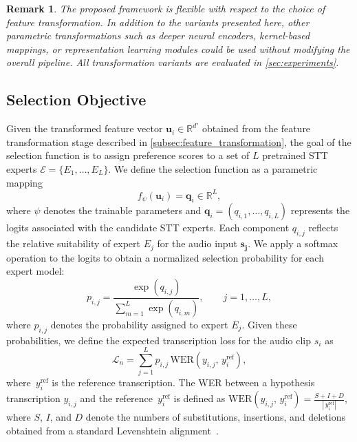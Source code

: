 \documentclass[journal]{IEEEtran}
\newtheorem{remark}{Remark}
\begin{document}
    \begin{remark}
        The proposed framework is flexible with respect to the choice of feature
        transformation. In addition to the variants presented here, other parametric
        transformations such as deeper neural encoders, kernel-based mappings, or
        representation learning modules could be used without modifying the overall
        pipeline. All transformation variants are evaluated in
        \cref{sec:experiments}.
    \end{remark}

    \subsection{Selection Objective}
    \label{subsec:selection_objective}

    Given the transformed feature vector $\mathbf{u}_{i}\in \mathbb{R}^{d'}$
    obtained from the feature transformation stage described in
    \cref{subsec:feature_transformation}, the goal of the selection function is to
    assign preference scores to a set of $L$ pretrained STT experts $\mathcal{E}=
    \{E_{1},\dots,E_{L}\}$. We define the selection function as a parametric
    mapping
    \[
        f_{\psi}(\mathbf{u}_{i}) = \mathbf{q}_{i}\in \mathbb{R}^{L},
    \]
    where $\psi$ denotes the trainable parameters and
    $\mathbf{q}_{i}= (q_{i,1}, \dots,q_{i,L})$ represents the logits associated
    with the candidate STT experts. Each component $q_{i,j}$ reflects the relative
    suitability of expert $E_{j}$ for the audio input $\mathbf{s_{j}}$. We apply a 
    softmax operation to the logits to obtain a normalized selection probability
    for each expert model:
    \begin{equation}
        p_{i,j}= \frac{\exp(q_{i,j})}{\sum_{m=1}^{L}\exp(q_{i,m})}, \qquad j=1,\dots
        ,L, \label{eq:softmax_router}
    \end{equation}
    where $p_{i,j}$ denotes the probability assigned to expert $E_{j}$. Given
    these probabilities, we define the expected transcription loss for the audio
    clip $s_{i}$ as
    \begin{equation}
        \mathcal{L}_{n}= \sum_{j=1}^{L}p_{i,j}\,\mathrm{WER}(y_{i,j},\,y_i^{\mathrm{ref}}), \label{eq:expected_loss}
    \end{equation}
    where $\,y_i^{\mathrm{ref}}$ is the reference transcription. The WER between a hypothesis
    transcription $y_{i,j}$ and the reference $\,y_i^{\mathrm{ref}}$ is defined as
    $\mathrm{WER}(y_{i,j}, \,y_i^{\mathrm{ref}}) = \frac{S + I + D}{|\,y_i^{\mathrm{ref}}|}$, where $S$, $I$, and
    $D$ denote the numbers of substitutions, insertions, and deletions obtained from
    a standard Levenshtein alignment~\cite{li2014overviewrobust}.
\end{document}
